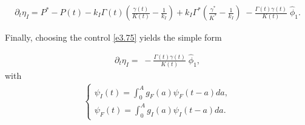 \documentclass[10pt, a4paper]{amsart}
\theoremstyle{plain}
\theoremstyle{definition}
\theoremstyle{remark}
\numberwithin{equation}{section}
\begin{document}
\begin{align}\label{e3.85}
    \partial_{t}\eta_{I}
= P^*-P(t)-k_I\Gamma(t)(\frac{\gamma(t)}{K(t)}-\frac{1}{k_I})+k_I\Gamma^*(\frac{\gamma^*}{K^*}-\frac{1}{k_I}) \;-\frac{\Gamma(t)\gamma(t)}{K(t)}\;\hat\phi_{1}.
\end{align}

Finally, choosing the control \eqref{e3.75} yields the simple form

\begin{align}\label{e3.86}
    \partial_{t}\eta_{I}= \;-\frac{\Gamma(t)\gamma(t)}{K(t)}\;\hat\phi_{1},
\end{align}
with 
\begin{align}\label{e3.87}
\begin{cases}
\psi_I(t)=\displaystyle\int_{0}^Ag_F(a)\psi_F(t-a)da,\\
\psi_F(t)=\displaystyle\int_{0}^Ag_I(a)\psi_I(t-a)da.   
\end{cases}
\end{align}
\end{document}
